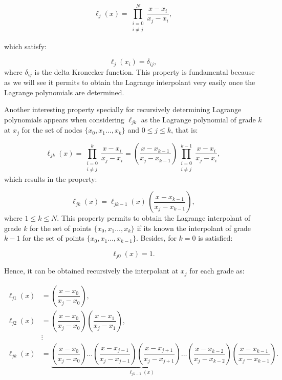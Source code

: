     \begin{equation}
    	\ell_j(x) =  \prod_{\substack{i=0 \\ i\neq j}}^{N} \dfrac{x - x_i}{x_j - x_i},
    \end{equation}
    
    which satisfy: 
    
    \begin{equation}
    	\ell_j(x_i) = \delta_{ij}, \label{eq:Lagrange_kronecker}
    \end{equation}
    where $\delta_{ij}$ is the delta Kronecker function. This property is fundamental because as we will see it permits to obtain the Lagrange interpolant very easily once the Lagrange polynomials are determined.
    
    Another interesting property specially for recursively determining Lagrange polynomials appears when considering   $\ell_{jk}$ as the Lagrange polynomial of grade $k$ at $x_j$ for the set of nodes $\{x_0,x_1\ldots,x_k\}$ and $0 \leq j\leq k$, that is:
    
    \begin{equation}
     \ell_{jk}(x) = \prod_{\substack{i=0 \\ i\neq j}}^{k} \dfrac{x - x_i}{x_j - x_i} = \left(\dfrac{x - x_{k-1}}{x_j - x_{k-1}}\right) \prod_{\substack{i=0 \\ i\neq j}}^{k-1} \dfrac{x - x_i}{x_j - x_i},
    \end{equation}
     which results in the property:
     
     \begin{equation}
     \ell_{jk}(x) = \ell_{jk-1}(x) \, \left(\dfrac{x - x_{k-1}}{x_j - x_{k-1}}\right),
     \label{eq:Lagrange_recursion}
     \end{equation}
     where $1\leq k \leq N$. This property permits to obtain the Lagrange interpolant of grade $k$ for the set of points $\{x_0,x_1\ldots,x_k\}$ if its known the interpolant of grade $k-1$ for the set of points $\{x_0,x_1\ldots,x_{k-1}\}$. Besides, for $k=0$ is satisfied:
     
     \begin{equation}
     	\ell_{j0}(x) = 1.
     \end{equation}
     
     Hence, it can be obtained recursively the interpolant at $x_j$ for each grade as:
     
     \begin{align*}
     	\ell_{j1}(x) & = \left(\dfrac{x - x_{0}}{x_j - x_{0}}\right), \\
     	\ell_{j2}(x) & = \left(\dfrac{x - x_{0}}{x_j - x_{0}}\right) \left(\dfrac{x - x_{1}}{x_j - x_{1}}\right), \\ 
     	& \vdots \\
     	\ell_{jk}(x) & = \underbrace{\left(\dfrac{x - x_{0}}{x_j - x_{0}}\right)  \ldots 
     	\left(\dfrac{x - x_{j-1}}{x_j - x_{j-1}}\right) \left(\dfrac{x - x_{j+1}}{x_j - x_{j+1}}\right) \ldots 
     	\left(\dfrac{x - x_{k-2}}{x_j - x_{k-2}}\right)}_{\ell_{jk-1}(x)} \left(\dfrac{x - x_{k-1}}{x_j - x_{k-1}}\right) . 
     \end{align*}
    

